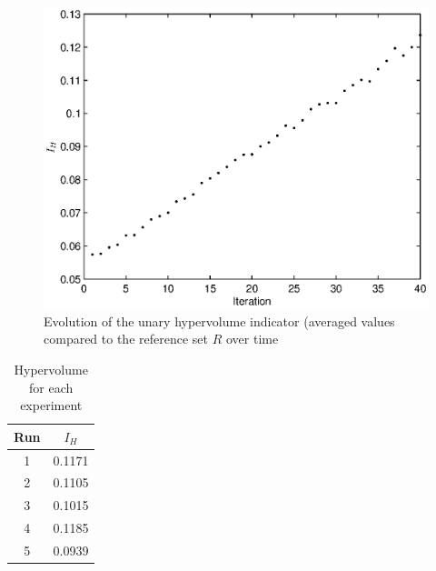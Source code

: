 \begin{figure}[h!]
\begin{center}
\includegraphics[width=1\linewidth]{hypervolref.eps}
\end{center}
\vspace{-0.5cm}
\caption{Evolution of the unary hypervolume indicator (averaged values compared to the reference set $R$ over time}
\label{fig:hypervolref}
\end{figure}

\begin{table}[h!]
\begin{center}
\begin{tabular}{|c|c|}
\hline Run & $I_H$\\
\hline 1 & 0.1171\\
\hline 2 & 0.1105\\
\hline 3 & 0.1015\\
\hline 4 & 0.1185\\
\hline 5 & 0.0939\\
\hline 
\end{tabular}
\end{center}
\caption{Hypervolume for each experiment}
\label{tab:hypervol}
\end{table}

